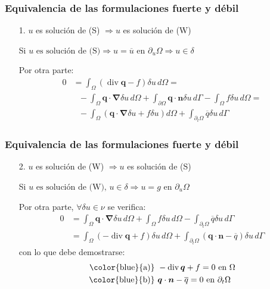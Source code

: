 \documentclass[handout]{beamer}
\begin{document}
\begin{frame}
\frametitle{Equivalencia de las formulaciones fuerte y débil}
\begin{itemize}
\item[1.] $u$ es solución de (S) $\Rightarrow u$ es solución de (W)

Si $u \textrm{ es solución de (S)} \Rightarrow u=\overline{u} \textrm{ en }
\partial_u \Omega \Rightarrow u \in \delta$

Por otra parte:
\begin{align*}
0&= \int_{\Omega} \left( \operatorname{div} \bm{q} -f \right) \delta u \, d \Omega= \\
 &\mbox{ } -\int_{\Omega} \bm{q} \cdot \bm{\nabla} \delta u \, d \Omega+
\int_{\partial \Omega} \bm{q} \cdot \bm{n} \delta u \, d \Gamma -
\int_{\Omega} f \delta u \, d\Omega= \\
 &\mbox{ } - \int_{\Omega} \left(
\bm{q} \cdot \bm{\nabla} \delta u + f \delta u \right) 
d \Omega+
\int_{\partial_t \Omega} \overline{q} \delta u \, d \Gamma
\end{align*}
\end{itemize}
\end{frame}
\begin{frame}
\frametitle{Equivalencia de las formulaciones fuerte y débil}
\begin{itemize}
\item[2.] $u$ es solución de (W) $\Rightarrow u$ es solución de (S)

Si $u \textrm{ es solución de (W), } u \in \delta \Rightarrow u=g \textrm{ en }
\partial_u \Omega$

Por otra parte, $\forall \delta u \in \nu$ se verifica:
\begin{align}
0&= \int_{\Omega} \bm{q} \cdot \bm{\nabla} \delta u \, d \Omega+
\int_{\Omega} f \delta u \, d\Omega -
\int_{\partial_t \Omega} \overline{q} \delta u \, d \Gamma \nonumber \\
&= \int_{\Omega} \left( -\operatorname{div} \bm{q} +f \right) \delta u \, d \Omega+
\int_{\partial_t \Omega} \left(\bm{q}\cdot \bm{n} - \overline{q}
\right) \delta u \, d \Gamma
\label{auxequi}
\end{align}
con lo que debe demostrarse:
\begin{align*}
\textrm{\color{blue}{a)} }&-\operatorname{div} \bm{q} +f=0 \textrm{ en } \Omega \\
\textrm{\color{blue}{b)} }&\bm{q}\cdot \bm{n} - \overline{q}=0 \textrm{ en } \partial_t \Omega
\end{align*}
\end{itemize}
\end{frame}
\end{document}
